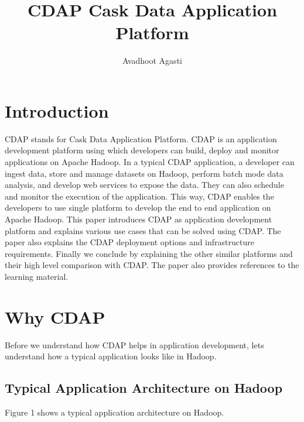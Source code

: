 \documentclass[9pt,twocolumn,twoside]{styles/osajnl}
\title{CDAP Cask Data Application Platform}
\author[1,*, +]{Avadhoot Agasti}
\affil[1]{School of Informatics and Computing, Bloomington, IN 47408, U.S.A.}
\affil[*]{Corresponding authors: aagasti@indiana.edu}
\affil[+]{HID - SL-IO-3000}
\begin{document}
\maketitle

\section{Introduction}

CDAP stands for Cask Data Application Platform. CDAP is an application
development platform using which developers can build, deploy and monitor
applications on Apache Hadoop. In a typical CDAP application, a developer can
ingest data, store and manage datasets on Hadoop, perform batch mode data
analysis, and develop web services to expose the data.
They can also schedule and monitor the execution of the application. This way,
CDAP enables the developers to use single platform to develop the end to end
application on Apache Hadoop.
This paper introduces CDAP as application development platform and explains
various use cases that can be solved using CDAP. The paper also explains the
CDAP deployment options and infrastructure requirements.
Finally we conclude by explaining the other similar platforms and their high
level comparison with CDAP.
The paper also provides references to the learning material.

\section{Why CDAP}
Before we understand how CDAP helps in application development, lets understand
how a typical application looks like in Hadoop.

\subsection{Typical Application Architecture on Hadoop}
Figure 1 shows a typical application architecture on Hadoop.
\end{document}
